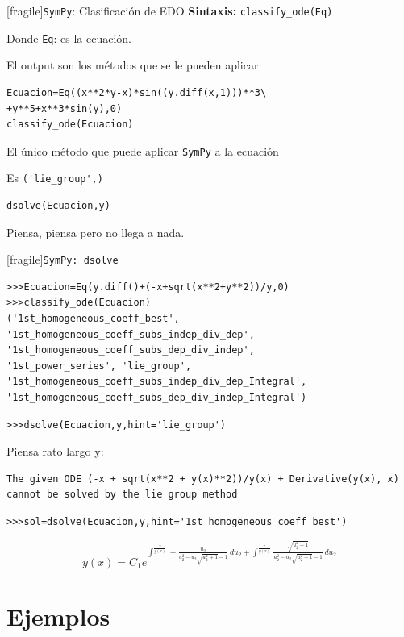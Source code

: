 \documentclass{article}
\begin{document}
[fragile]{\texttt{SymPy}: Clasificación de EDO}
\textbf{Sintaxis:} \verb+classify_ode(Eq)+

Donde
\verb+Eq+: es la ecuación.

El output son los métodos que se le pueden aplicar
\begin{lstlisting}
Ecuacion=Eq((x**2*y-x)*sin((y.diff(x,1)))**3\
+y**5+x**3*sin(y),0)
classify_ode(Ecuacion)
\end{lstlisting}

El único método que puede aplicar \texttt{SymPy} a la ecuación 


Es \verb+('lie_group',)+
\begin{lstlisting}
dsolve(Ecuacion,y)
\end{lstlisting}
Piensa, piensa   pero no llega a nada.


[fragile]{\texttt{SymPy: dsolve} }

\begin{lstlisting}
>>>Ecuacion=Eq(y.diff()+(-x+sqrt(x**2+y**2))/y,0)
>>>classify_ode(Ecuacion)
('1st_homogeneous_coeff_best', 
'1st_homogeneous_coeff_subs_indep_div_dep', 
'1st_homogeneous_coeff_subs_dep_div_indep', 
'1st_power_series', 'lie_group', 
'1st_homogeneous_coeff_subs_indep_div_dep_Integral', 
'1st_homogeneous_coeff_subs_dep_div_indep_Integral')
\end{lstlisting}

\begin{lstlisting}
>>>dsolve(Ecuacion,y,hint='lie_group')
\end{lstlisting}
Piensa rato largo y:
\begin{lstlisting}
The given ODE (-x + sqrt(x**2 + y(x)**2))/y(x) + Derivative(y(x), x) 
cannot be solved by the lie group method
\end{lstlisting}


\begin{lstlisting}
>>>sol=dsolve(Ecuacion,y,hint='1st_homogeneous_coeff_best')
\end{lstlisting}

\[y{\left (x \right )} = C_{1} e^{\int^{\frac{x}{y{\left (x \right )}}} -\frac{u_{2}}{u_{2}^{2} - u_{2} \sqrt{u_{2}^{2} + 1} - 1}\, du_{2} + \int^{\frac{x}{y{\left (x \right )}}} \frac{\sqrt{u_{2}^{2} + 1}}{u_{2}^{2} - u_{2} \sqrt{u_{2}^{2} + 1} - 1}\, du_{2}}\]



\section[Ejemplos]{Ejemplos}
\end{document}
